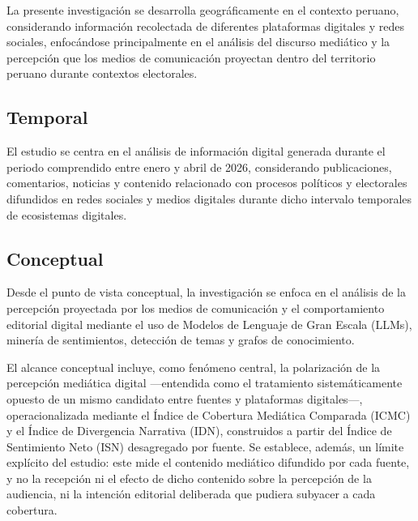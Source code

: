 La presente investigación se desarrolla geográficamente en el contexto peruano, considerando información recolectada de diferentes plataformas digitales y redes sociales, enfocándose principalmente en el análisis del discurso mediático y la percepción que los medios de comunicación proyectan dentro del territorio peruano durante contextos electorales.


\subsection{Temporal}

El estudio se centra en el análisis de información digital generada durante el periodo comprendido entre enero y abril de 2026, considerando publicaciones, comentarios, noticias y contenido relacionado con procesos políticos y electorales difundidos en redes sociales y medios digitales durante dicho intervalo temporales de ecosistemas digitales.

\subsection{Conceptual}

Desde el punto de vista conceptual, la investigación se enfoca en el análisis de la percepción proyectada por los medios de comunicación y el comportamiento editorial digital mediante el uso de Modelos de Lenguaje de Gran Escala (LLMs), minería de sentimientos, detección de temas y grafos de conocimiento.

El alcance conceptual incluye, como fenómeno central, la polarización de la percepción mediática digital —entendida como el tratamiento sistemáticamente opuesto de un mismo candidato entre fuentes y plataformas digitales—, operacionalizada mediante el Índice de Cobertura Mediática Comparada (ICMC) y el Índice de Divergencia Narrativa (IDN), construidos a partir del Índice de Sentimiento Neto (ISN) desagregado por fuente. Se establece, además, un límite explícito del estudio: este mide el contenido mediático difundido por cada fuente, y no la recepción ni el efecto de dicho contenido sobre la percepción de la audiencia, ni la intención editorial deliberada que pudiera subyacer a cada cobertura.